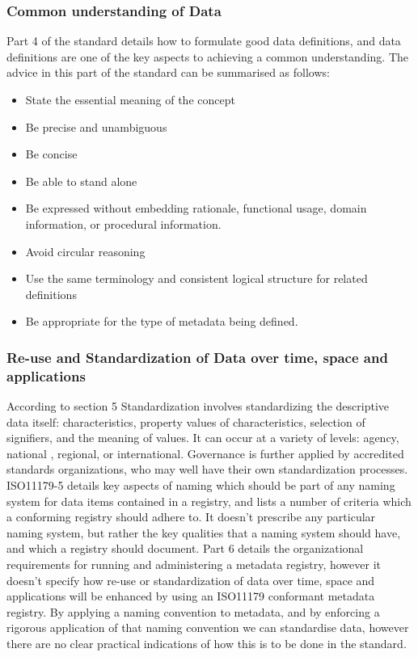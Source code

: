 \documentclass{llncs}
\begin{document}
\subsubsection{Common understanding of Data}

Part 4 of the standard details how to formulate good data definitions, and data definitions are one of the key aspects to achieving a common understanding. The advice in this part of the standard can be summarised as follows: 
\begin{itemize}
\item State the essential meaning of the concept
\item Be precise and unambiguous
\item Be concise
\item Be able to stand alone
\item Be expressed without embedding rationale, functional usage, domain information, or procedural information.
\item Avoid circular reasoning
\item Use the same terminology and consistent logical structure for related definitions
\item Be appropriate for the type of metadata being defined.
\end{itemize}

\subsubsection{Re-use and Standardization of Data over time, space and applications}

According to section 5 Standardization involves standardizing the descriptive data itself: characteristics, property values of characteristics, selection of signifiers, and the meaning of values.  It can occur at a variety of levels: agency, national , regional, or international. Governance is further applied by accredited standards organizations, who may well have their own standardization processes. ISO11179-5 details key aspects of naming which should be part of any naming system for data items contained in a registry, and lists a number of criteria which a conforming registry should adhere to. It doesn't prescribe any particular naming system, but rather the key qualities that a naming system should have, and which a registry should document. Part 6 details the organizational requirements for running and administering a metadata registry, however it doesn't specify how re-use or standardization of data over time, space and applications will be enhanced by using an ISO11179 conformant metadata registry. By applying a naming convention to metadata, and by enforcing a rigorous application of that naming convention we can standardise data, however there are no clear practical indications of how this is to be done in the standard.
\end{document}
